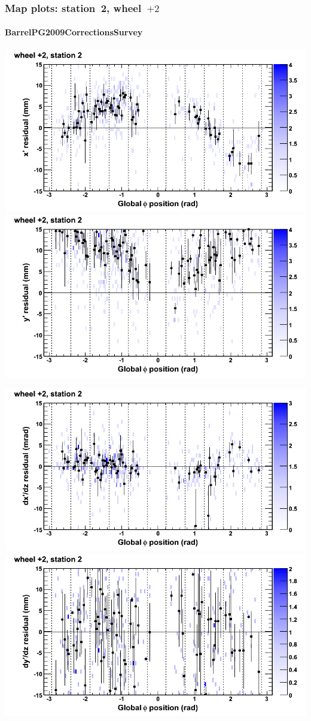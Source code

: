 \documentclass[compress]{beamer}
\begin{document}
\begin{frame}
\frametitle{Map plots: station~2, wheel~$+2$}
\framesubtitle{BarrelPG2009CorrectionsSurvey}
\includegraphics[width=0.5\linewidth]{mapplots_01/DTvsphi_st2whE_x.png}
\includegraphics[width=0.5\linewidth]{mapplots_01/DTvsphi_st2whE_y.png}

\includegraphics[width=0.5\linewidth]{mapplots_01/DTvsphi_st2whE_dxdz.png}
\includegraphics[width=0.5\linewidth]{mapplots_01/DTvsphi_st2whE_dydz.png}
\end{frame}
\end{document}
